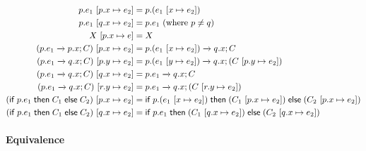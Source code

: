 \documentclass{article}
\theoremstyle{definition}
\newcommand{\subst}[3]{#1~[#2 \mapsto #3]}
\newcommand{\ceq}{\equiv}
\newcommand{\own}[2]{#1.#2}
\newcommand{\send}[3][]{#2\nolinebreak \mathrel{\xrightarrow{#1}}\nolinebreak #3}
\newcommand{\cif}[3]{\textsf{if}~#1 \mathrel{\textsf{then}}\nolinebreak #2 \mathrel{\textsf{else}}\nolinebreak #3}
\newcommand{\clet}[2]{\textsf{let}~#1\nolinebreak =\nolinebreak #2 \mathrel{\textsf{in}}}
\begin{document}
\begin{align*}
  \subst{p.e_1}{\own{p}{x}}{e_2} &= p.(\subst{e_1}{x}{e_2})\\
  \subst{p.e_1}{\own{q}{x}}{e_2} &= p.e_1~\textrm{(where $p \neq q$)}\\
  \subst{X}{\own{p}{x}}{e} &= X\\
  \subst{(\send{\own{p}{e_1}}{\own{p}{x}}; C)}{\own{p}{x}}{e_2} &= \send{\own{p}{(\subst{e_1}{x}{e_2})}}{\own{q}{x}}; C\\
  \subst{(\send{\own{p}{e_1}}{\own{q}{x}}; C)}{\own{p}{y}}{e_2} &= \send{\own{p}{(\subst{e_1}{y}{e_2})}}{\own{q}{x}}; (\subst{C}{\own{p}{y}}{e_2})\\
  \subst{(\send{\own{p}{e_1}}{\own{q}{x}}; C)}{\own{q}{x}}{e_2} &= \send{\own{p}{e_1}}{\own{q}{x}}; C\\
  \subst{(\send{\own{p}{e_1}}{\own{q}{x}}; C)}{\own{r}{y}}{e_2} &= \send{\own{p}{e_1}}{\own{q}{x}}; (\subst{C}{\own{r}{y}}{e_2})\\
  \subst{(\cif{\own{p}{e_1}}{C_1}{C_2})}{\own{p}{x}}{e_2} &= \cif{\own{p}{(\subst{e_1}{x}{e_2})}}{(\subst{C_1}{\own{p}{x}}{e_2})}{(\subst{C_2}{\own{p}{x}}{e_2})}\\
  \subst{(\cif{\own{p}{e_1}}{C_1}{C_2})}{\own{q}{x}}{e_2} &= \cif{\own{p}{e_1}}{(\subst{C_1}{\own{q}{x}}{e_2})}{(\subst{C_2}{\own{q}{x}}{e_2})}
\end{align*}

\paragraph{Equivalence}
\noindent{}
\end{document}
